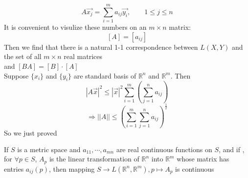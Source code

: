 \begin{equation}\tag{$ \ast $}
    A\vec{x_j}=\sum\limits_{i=1}^{m } a_{ij}\vec{y_i},\qquad 1 \leqslant j \leqslant n
\end{equation}    
It is convenient to visulize these numbers on an  $ m\times n  $ matrix:
\[[A]=[a_{ij}]\]
Then we find that there is a natural 1-1 correspondence between  $ L(X,Y) $ and the set of all  $ m\times n  $ real matrices\\
and  $ [BA]=[B]\cdot[A] $ \\
Suppose  $ \{x_i \} $ and  $ \{y_i\} $ are standard basis of  $ \mathbb{R}^n  $ and  $ \mathbb{R }^m $. Then 
\[|A\vec{x}|^2 \leqslant |\vec{x}|^2 \sum\limits_{i=1}^{m } (\sum\limits_{j=1 }^{n } a_{ij})\] 
\[\Rightarrow ||A|| \leqslant (\sum\limits_{i=1}^{m } \sum\limits_{j=1 }^{n } a_{ij})^{\frac{1 }{2 }}\]
So we just proved
\begin{theorem}
    If  $ S  $ is a metric space and  $ a_{11 },\cdots,a_{mn} $ are real continuous functions on  $ S  $, and if , for  $ \forall p\in S  $, $ A_p  $ is the linear transformation of  $ \mathbb{R }^n  $ into  $ \mathbb{R }^m  $ whose matrix has entries  $ a_{ij}(p ) $, then mapping  $ S\rightarrow L(\mathbb{R }^n ,\mathbb{R }^m ),p\mapsto A_p $ is continuous  
\end{theorem}
